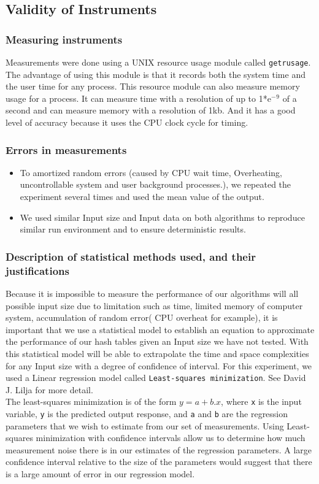 \documentclass[a4paper,12pt, openany]{book}
\begin{document}
\subsection{Validity of Instruments} 
\subsubsection{Measuring instruments}
Measurements were done using a UNIX resource usage module called \texttt{getrusage}. The advantage of using this module is that it records both the system time and the user time for any process. This resource module can also measure memory usage for a process. It can measure time with a resolution of up to 1*e$^-$$^9$ of a second and can measure memory with a resolution of 1kb. And it has a good level of accuracy because it uses the CPU clock cycle for timing. 
\subsubsection{Errors in measurements}
\begin{itemize}
	\item To amortized random errors (caused by CPU wait time, Overheating, uncontrollable system and user background processes.), we repeated the experiment several times and used the mean value of the output.
	\item We used similar Input size and Input data on both algorithms to reproduce similar run environment and to ensure deterministic results.
\end{itemize}
\subsubsection{Description of statistical methods used, and their justifications}
Because it is impossible to measure the performance of our algorithms will all possible input size due to limitation such as time, limited memory of computer system, accumulation of random error( CPU overheat for example), it is important that we use a statistical model to establish an equation to approximate the performance of our hash tables given an Input size we have not tested. With this statistical model will be able to extrapolate the time and space complexities for any Input size with a degree of confidence of interval. \bigbreak
For this experiment, we used a Linear regression model called \texttt{Least-squares minimization}. See David J. Lilja \cite{lilja2005measuring} for more detail. \\
The least-squares minimization is of the form $ y = a + b.x$, where \texttt{x} is the input variable, \texttt{y} is the predicted output response, and \texttt{a} and \texttt{b} are
the regression parameters that we wish to estimate from our set of measurements.\bigbreak
Using Least-squares minimization with confidence intervals allow us to determine how much measurement noise there is in our estimates of the regression parameters. A large confidence interval relative to the size of the parameters would suggest that there is a large amount of error in our regression model. 
\end{document}
